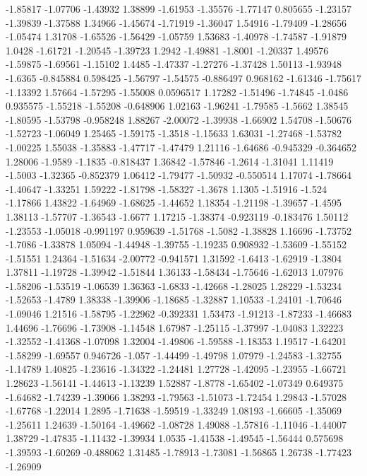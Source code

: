 \documentclass[9pt]{article}
\theoremstyle{plain}
\theoremstyle{definition}
\theoremstyle{remark}
\numberwithin{equation}{section}
\begin{document}
-1.85817
-1.07706
-1.43932
1.38899
-1.61953
-1.35576
-1.77147
0.805655
-1.23157
-1.39839
-1.37588
1.34966
-1.45674
-1.71919
-1.36047
1.54916
-1.79409
-1.28656
-1.05474
1.31708
-1.65526
-1.56429
-1.05759
1.53683
-1.40978
-1.74587
-1.91879
1.0428
-1.61721
-1.20545
-1.39723
1.2942
-1.49881
-1.8001
-1.20337
1.49576
-1.59875
-1.69561
-1.15102
1.4485
-1.47337
-1.27276
-1.37428
1.50113
-1.93948
-1.6365
-0.845884
0.598425
-1.56797
-1.54575
-0.886497
0.968162
-1.61346
-1.75617
-1.13392
1.57664
-1.57295
-1.55008
0.0596517
1.17282
-1.51496
-1.74845
-1.0486
0.935575
-1.55218
-1.55208
-0.648906
1.02163
-1.96241
-1.79585
-1.5662
1.38545
-1.80595
-1.53798
-0.958248
1.88267
-2.00072
-1.39938
-1.66902
1.54708
-1.50676
-1.52723
-1.06049
1.25465
-1.59175
-1.3518
-1.15633
1.63031
-1.27468
-1.53782
-1.00225
1.55038
-1.35883
-1.47717
-1.47479
1.21116
-1.64686
-0.945329
-0.364652
1.28006
-1.9589
-1.1835
-0.818437
1.36842
-1.57846
-1.2614
-1.31041
1.11419
-1.5003
-1.32365
-0.852379
1.06412
-1.79477
-1.50932
-0.550514
1.17074
-1.78664
-1.40647
-1.33251
1.59222
-1.81798
-1.58327
-1.3678
1.1305
-1.51916
-1.524
-1.17866
1.43822
-1.64969
-1.68625
-1.44652
1.18354
-1.21198
-1.39657
-1.4595
1.38113
-1.57707
-1.36543
-1.6677
1.17215
-1.38374
-0.923119
-0.183476
1.50112
-1.23553
-1.05018
-0.991197
0.959639
-1.51768
-1.5082
-1.38828
1.16696
-1.73752
-1.7086
-1.33878
1.05094
-1.44948
-1.39755
-1.19235
0.908932
-1.53609
-1.55152
-1.51551
1.24364
-1.51634
-2.00772
-0.941571
1.31592
-1.6413
-1.62919
-1.3804
1.37811
-1.19728
-1.39942
-1.51844
1.36133
-1.58434
-1.75646
-1.62013
1.07976
-1.58206
-1.53519
-1.06539
1.36363
-1.6833
-1.42668
-1.28025
1.28229
-1.53234
-1.52653
-1.4789
1.38338
-1.39906
-1.18685
-1.32887
1.10533
-1.24101
-1.70646
-1.09046
1.21516
-1.58795
-1.22962
-0.392331
1.53473
-1.91213
-1.87233
-1.46683
1.44696
-1.76696
-1.73908
-1.14548
1.67987
-1.25115
-1.37997
-1.04083
1.32223
-1.32552
-1.41368
-1.07098
1.32004
-1.49806
-1.59588
-1.18353
1.19517
-1.64201
-1.58299
-1.69557
0.946726
-1.057
-1.44499
-1.49798
1.07979
-1.24583
-1.32755
-1.14789
1.40825
-1.23616
-1.34322
-1.24481
1.27728
-1.42095
-1.23955
-1.66721
1.28623
-1.56141
-1.44613
-1.13239
1.52887
-1.8778
-1.65402
-1.07349
0.649375
-1.64682
-1.74239
-1.39066
1.38293
-1.79563
-1.51073
-1.72454
1.29843
-1.57028
-1.67768
-1.22014
1.2895
-1.71638
-1.59519
-1.33249
1.08193
-1.66605
-1.35069
-1.25611
1.24639
-1.50164
-1.49662
-1.08728
1.49088
-1.57816
-1.11046
-1.44007
1.38729
-1.47835
-1.11432
-1.39934
1.0535
-1.41538
-1.49545
-1.56444
0.575698
-1.39593
-1.60269
-0.488062
1.31485
-1.78913
-1.73081
-1.56865
1.26738
-1.77423
-1.26909
\end{document}
